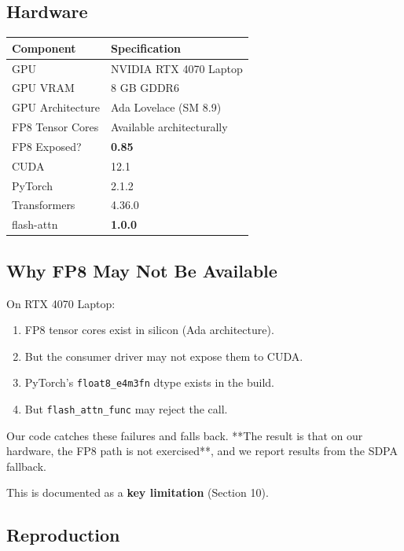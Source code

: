 \subsection{Hardware}

\begin{table}[H]
\centering
\small
\begin{tabular}{ll}
\toprule
\textbf{Component} & \textbf{Specification} \\
\midrule
GPU & NVIDIA RTX 4070 Laptop \\
GPU VRAM & 8 GB GDDR6 \\
GPU Architecture & Ada Lovelace (SM 8.9) \\
FP8 Tensor Cores & Available architecturally \\
FP8 Exposed? & \textbf{0.85} \\
CUDA & 12.1 \\
PyTorch & 2.1.2 \\
Transformers & 4.36.0 \\
flash-attn & \textbf{1.0.0} \\
\bottomrule
\end{tabular}
\end{table}

\subsection{Why FP8 May Not Be Available}

On RTX 4070 Laptop:

\begin{enumerate}
\item FP8 tensor cores exist in silicon (Ada architecture).
\item But the consumer driver may not expose them to CUDA.
\item PyTorch's \texttt{float8\_e4m3fn} dtype exists in the build.
\item But \texttt{flash\_attn\_func} may reject the call.

\end{enumerate}
Our code catches these failures and falls back. **The result is that on 
our hardware, the FP8 path is not exercised**, and we report results from 
the SDPA fallback.

This is documented as a \textbf{key limitation} (Section 10).

\subsection{Reproduction}


